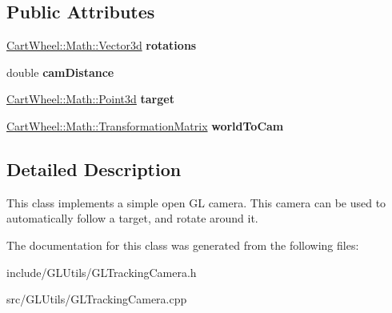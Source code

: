 \subsection*{Public Attributes}
\begin{DoxyCompactItemize}
\item 
\hypertarget{classCartWheel_1_1GL_1_1GLTrackingCamera_a18321b7a052369d135e06884b11278fb}{
\hyperlink{classCartWheel_1_1Math_1_1Vector3d}{CartWheel::Math::Vector3d} {\bfseries rotations}}
\label{classCartWheel_1_1GL_1_1GLTrackingCamera_a18321b7a052369d135e06884b11278fb}

\item 
\hypertarget{classCartWheel_1_1GL_1_1GLTrackingCamera_ac9e1164d3ad06c97a007564fc32e6ae8}{
double {\bfseries camDistance}}
\label{classCartWheel_1_1GL_1_1GLTrackingCamera_ac9e1164d3ad06c97a007564fc32e6ae8}

\item 
\hypertarget{classCartWheel_1_1GL_1_1GLTrackingCamera_a957bfb50736472ce8a5f036e3b8776f9}{
\hyperlink{classCartWheel_1_1Math_1_1Point3d}{CartWheel::Math::Point3d} {\bfseries target}}
\label{classCartWheel_1_1GL_1_1GLTrackingCamera_a957bfb50736472ce8a5f036e3b8776f9}

\item 
\hypertarget{classCartWheel_1_1GL_1_1GLTrackingCamera_abf44b47bc709e0938679d3985f1210fb}{
\hyperlink{classCartWheel_1_1Math_1_1TransformationMatrix}{CartWheel::Math::TransformationMatrix} {\bfseries worldToCam}}
\label{classCartWheel_1_1GL_1_1GLTrackingCamera_abf44b47bc709e0938679d3985f1210fb}

\end{DoxyCompactItemize}


\subsection{Detailed Description}
This class implements a simple open GL camera. This camera can be used to automatically follow a target, and rotate around it. 

The documentation for this class was generated from the following files:\begin{DoxyCompactItemize}
\item 
include/GLUtils/GLTrackingCamera.h\item 
src/GLUtils/GLTrackingCamera.cpp\end{DoxyCompactItemize}
